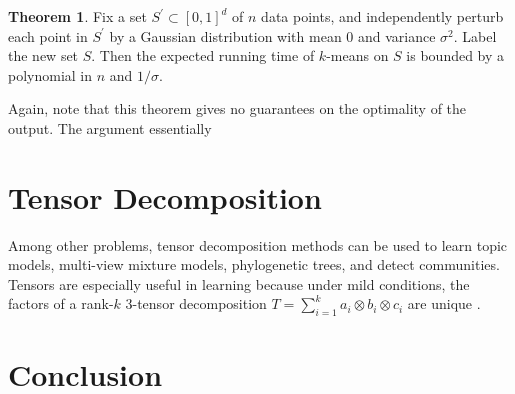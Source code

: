 \documentclass[11pt]{article}
\theoremstyle{definition}
\newtheorem{theorem}{Theorem}
\begin{document}
\begin{theorem}
Fix a set $S^{\prime} \subset [0,1]^d$ of $n$ data points, and
independently perturb each point in $S^{\prime}$ by a Gaussian
distribution with mean 0 and variance $\sigma^2$. Label the new set
$S$. Then the expected running time of $k$-means on $S$ is bounded by
a polynomial in $n$ and $1/\sigma$.
\end{theorem}
Again, note that this theorem gives no guarantees on the optimality of
the output. The argument essentially 

\section{Tensor Decomposition}
Among other problems, tensor decomposition methods can be used to
learn topic models, multi-view mixture models, phylogenetic trees, and
detect communities. Tensors are especially useful in learning because
under mild conditions, the factors of a rank-$k$ 3-tensor decomposition $T =
\sum_{i=1}^ka_i \otimes b_i \otimes c_i$ are unique
\cite{tensorunique}.

\section{Conclusion}
\end{document}
